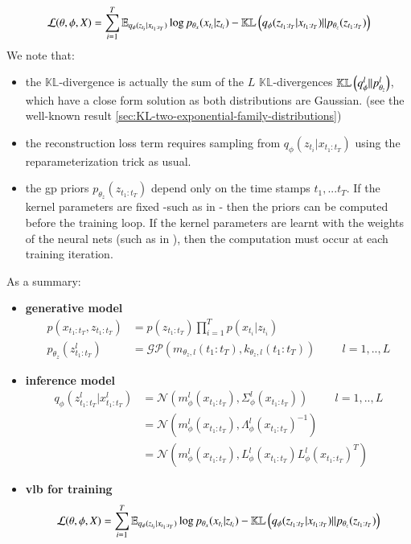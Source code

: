 \begin{align}
    \mathcal{L}(\theta, \phi, X) = \sum_{i=1}^T \mathbb{E}_{q_{\phi}(z_{t_i} \vert x_{t_1:t_T})} \log{p_{\theta_x}(x_{t_i} \vert z_{t_i})} - \mathbb{KL}\left( q_{\phi}(z_{t_1:t_T} \vert x_{t_1:t_T}) \vert\vert p_{\theta_z}(z_{t_1:t_T}) \right)
\end{align}
We note that:
\begin{itemize}
    \item the $\mathbb{KL}$-divergence is actually the sum of the $L$ $\mathbb{KL}$-divergences $\mathbb{KL}\left( q_{\phi}^l \vert\vert p_{\theta_z}^l \right)$, which have a close form solution as both distributions are Gaussian. (see the well-known result \ref{sec:KL-two-exponential-family-distributions})
    \item the reconstruction loss term requires sampling from $q_{\phi}(z_{t_i} \vert x_{t_1:t_T})$ using the reparameterization trick as usual.
    \item the \gls{gp} priors $p_{\theta_z}(z_{t_1:t_T})$ depend only on the time stamps $t_1,...t_T$. If the kernel parameters are fixed -such as in \cite{fortuin_gp-vae:_2020}- then the priors can be computed before the training loop. If the kernel parameters are learnt with the weights of the neural nets (such as in \cite{zhu_markovian_2023}), then the computation must occur at each training iteration.
\end{itemize}

As a summary:
\begin{tcolorbox}[colback=blue!5!white,colframe=black!75!black,title=Gaussian Process VAEs]
\begin{itemize}
    \item \textbf{generative model}
    \begin{align}
        \label{gen_model_gpvae}
        p(x_{t_1:t_T}, z_{t_1:t_T}) &= p(z_{t_1:t_T}) \prod_{i=1}^T p(x_{t_i} \vert z_{t_{i}}) \\
        p_{\theta_z}(z_{t_1:t_T}^l) &= \mathcal{GP}(m_{\theta_z, l}(t_1:t_T), k_{\theta_z, l}(t_1:t_T)) \hspace{1cm} l=1,..,L
    \end{align}
    \item \textbf{inference model}
    \begin{align}
        \label{inf_model_gpvae}
        q_\phi(z_{t_1:t_T}^l \vert x_{t_1:t_T}^l) &= \mathcal{N}(m_{\phi}^l(x_{t_1:t_T}), \Sigma_{\phi}^l(x_{t_1:t_T})) \hspace{1cm} l=1,..,L \\
        &= \mathcal{N}(m_{\phi}^l(x_{t_1:t_T}), \Lambda_{\phi}^l(x_{t_1:t_T})^{-1}) \\
        &= \mathcal{N}(m_{\phi}^l(x_{t_1:t_T}), L_{\phi}^l(x_{t_1:t_T})L_{\phi}^l(x_{t_1:t_T})^T)
    \end{align}
    \item \textbf{\gls{vlb} for training}
    \begin{align}
        \label{vlb_gpvae}
        \mathcal{L}(\theta, \phi, X) = \sum_{i=1}^T \mathbb{E}_{q_{\phi}(z_{t_i} \vert x_{t_1:t_T})} \log{p_{\theta_x}(x_{t_i} \vert z_{t_i})} - \mathbb{KL}\left( q_{\phi}(z_{t_1:t_T} \vert x_{t_1:t_T}) \vert\vert p_{\theta_z}(z_{t_1:t_T}) \right) 
    \end{align}
\end{itemize}
\end{tcolorbox}

